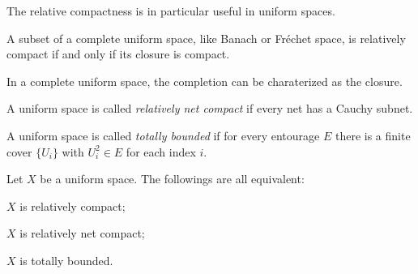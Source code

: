 \documentclass{../exp}
\begin{document}
The relative compactness is in particular useful in uniform spaces.
\begin{prop}
A subset of a complete uniform space, like Banach or Fr\'echet space, is relatively compact if and only if its closure is compact.
\end{prop}
\begin{pf}
In a complete uniform space, the completion can be charaterized as the closure.
\end{pf}
\begin{defn}
A uniform space is called \emph{relatively net compact} if every net has a Cauchy subnet.
\end{defn}
\begin{defn}
A uniform space is called \emph{totally bounded} if for every entourage $E$ there is a finite cover $\{U_i\}$ with $U_i^2\in E$ for each index $i$.
\end{defn}
\begin{thm}
Let $X$ be a uniform space.
The followings are all equivalent:
\begin{cond}
\item $X$ is relatively compact;
\item $X$ is relatively net compact;
\item $X$ is totally bounded.
\end{cond}
\end{thm}
\end{document}
